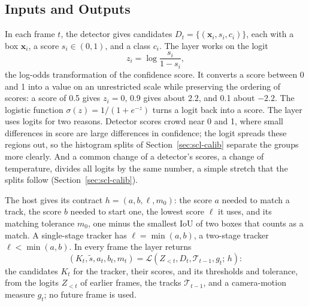 \subsection{Inputs and Outputs}\label{sec:scl-problem}
In each frame $t$, the detector gives candidates $D_t=\{(\mathbf{x}_i,s_i,c_i)\}$, each with a box $\mathbf{x}_i$, a score $s_i\in(0,1)$, and a class $c_i$. The layer works on the logit
\begin{equation}
z_i=\log\frac{s_i}{1-s_i},
\label{eq:scl-logit}
\end{equation}
the log-odds transformation of the confidence score. It converts a score between 0 and 1 into a value on an unrestricted scale while preserving the ordering of scores: a score of 0.5 gives $z_i=0$, 0.9 gives about $2.2$, and 0.1 about $-2.2$. The logistic function $\sigma(z)=1/(1+e^{-z})$ turns a logit back into a score. The layer uses logits for two reasons. Detector scores crowd near 0 and 1, where small differences in score are large differences in confidence; the logit spreads these regions out, so the histogram splits of Section~\ref{sec:scl-calib} separate the groups more clearly. And a common change of a detector's scores, a change of temperature, divides all logits by the same number, a simple stretch that the splits follow (Section~\ref{sec:scl-calib}).

The host gives its contract $h=(a,b,\ell,m_0)$: the score $a$ needed to match a track, the score $b$ needed to start one, the lowest score $\ell$ it uses, and its matching tolerance $m_0$, one minus the smallest IoU of two boxes that counts as a match. A single-stage tracker has $\ell=\min(a,b)$, a two-stage tracker $\ell<\min(a,b)$. In every frame the layer returns
\begin{equation}
\left(K_t,\tilde{s},a_t,b_t,m_t\right)=
\mathcal{L}\left(Z_{<t},D_t,\mathcal{T}_{t-1},g_t;\,h\right):
\label{eq:scl-layer}
\end{equation}
the candidates $K_t$ for the tracker, their scores, and its thresholds and tolerance, from the logits $Z_{<t}$ of earlier frames, the tracks $\mathcal{T}_{t-1}$, and a camera-motion measure $g_t$; no future frame is used.

